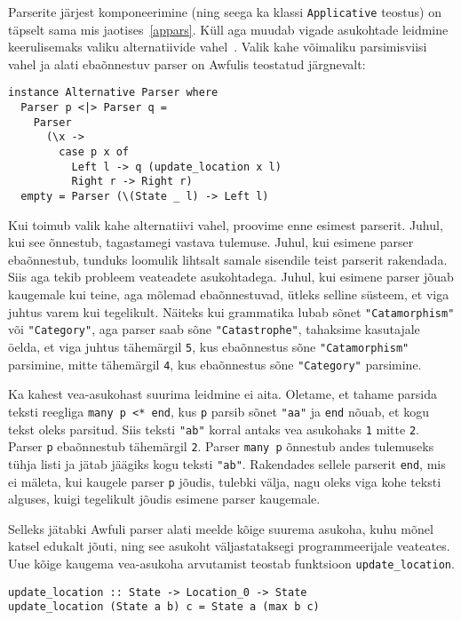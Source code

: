 \documentclass[12pt]{article}
\begin{document}
        Parserite järjest komponeerimine (ning seega ka klassi \verb!Applicative! teostus) on täpselt sama mis jaotises~\ref{appars}. Küll aga muudab vigade asukohtade leidmine keerulisemaks valiku alternatiivide vahel~\cite{Err}. Valik kahe võimaliku parsimisviisi vahel ja alati ebaõnnestuv parser on Awfulis teostatud järgnevalt:

        \begin{verbatim}instance Alternative Parser where
  Parser p <|> Parser q =
    Parser
      (\x ->
        case p x of
          Left l -> q (update_location x l)
          Right r -> Right r)
  empty = Parser (\(State _ l) -> Left l)\end{verbatim}

        Kui toimub valik kahe alternatiivi vahel, proovime enne esimest parserit. Juhul, kui see õnnestub, tagastamegi vastava tulemuse. Juhul, kui esimene parser ebaõnnestub, tunduks loomulik lihtsalt samale sisendile teist parserit rakendada. Siis aga tekib probleem veateadete asukohtadega. Juhul, kui esimene parser jõuab kaugemale kui teine, aga mõlemad ebaõnnestuvad, ütleks selline süsteem, et viga juhtus varem kui tegelikult. Näiteks kui grammatika lubab sõnet \verb!"Catamorphism"! või \verb!"Category"!, aga parser saab sõne \verb!"Catastrophe"!, tahaksime kasutajale öelda, et viga juhtus tähemärgil \verb!5!, kus ebaõnnestus sõne \verb!"Catamorphism"! parsimine, mitte tähemärgil \verb!4!, kus ebaõnnestus sõne \verb!"Category"! parsimine.

        Ka kahest vea-asukohast suurima leidmine ei aita. Oletame, et tahame parsida teksti reegliga \verb!many p <* end!, kus \verb!p! parsib sõnet \verb!"aa"! ja \verb!end! nõuab, et kogu tekst oleks parsitud. Siis teksti \verb!"ab"! korral antaks vea asukohaks \verb!1! mitte \verb!2!. Parser \verb!p! ebaõnnestub tähemärgil \verb!2!. Parser \verb!many p! õnnestub andes tulemuseks tühja listi ja jätab jäägiks kogu teksti \verb!"ab"!. Rakendades sellele parserit \verb!end!, mis ei mäleta, kui kaugele parser \verb!p! jõudis, tulebki välja, nagu oleks viga kohe teksti alguses, kuigi tegelikult jõudis esimene parser kaugemale.

        Selleks jätabki Awfuli parser alati meelde kõige suurema asukoha, kuhu mõnel katsel edukalt jõuti, ning see asukoht väljastataksegi programmeerijale veateates. Uue kõige kaugema vea-asukoha arvutamist teostab funktsioon \verb!update_location!.

        \begin{verbatim}update_location :: State -> Location_0 -> State
update_location (State a b) c = State a (max b c)\end{verbatim}
\end{document}
